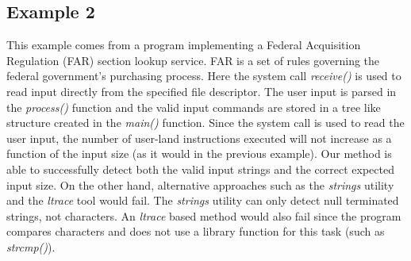 \documentclass{sig-alternate-05-2015}
\begin{document}
 
 
\lstset{style=mystyle}
 


\subsection{Example 2}
This example comes from a program implementing a Federal Acquisition Regulation (FAR) section lookup service.
FAR is a set of rules governing the federal government's purchasing process.
Here the system call \textit{receive()} is used to read input directly from the specified file descriptor.
The user input is parsed in the \textit{process()} function and the valid input commands are stored in a tree like structure created in the \textit{main()} function.
Since the system call is used to read the user input, the number of user-land instructions executed will not increase as a function of the input size (as it would in the previous example).
Our method is able to successfully detect both the valid input strings and the correct expected input size.
On the other hand, alternative approaches such as the \textit{strings} utility and the \textit{ltrace} tool would fail.
The \textit{strings} utility can only detect null terminated strings, not characters.
An \textit{ltrace} based method would also fail since the program compares characters and does not use a library function for this task (such as \textit{strcmp()}).



\end{document}
